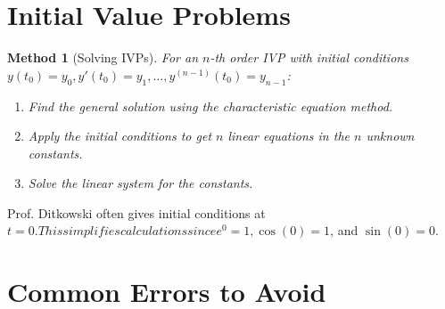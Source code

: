 \documentclass[12pt]{article}
\newtheorem{method}{Method}
\begin{document}

\section{Initial Value Problems}

\begin{method}[Solving IVPs]
For an $n$-th order IVP with initial conditions $y(t_0) = y_0, y'(t_0) = y_1, \ldots, y^{(n-1)}(t_0) = y_{n-1}$:
\begin{enumerate}
    \item Find the general solution using the characteristic equation method.
    \item Apply the initial conditions to get $n$ linear equations in the $n$ unknown constants.
    \item Solve the linear system for the constants.
\end{enumerate}
\end{method}

\begin{examtip}
Prof. Ditkowski often gives initial conditions at $t = 0. This simplifies calculations since e^0 = 1, \cos(0) = 1$, and $\sin(0) = 0$.
\end{examtip}

\section{Common Errors to Avoid}
\end{document}
